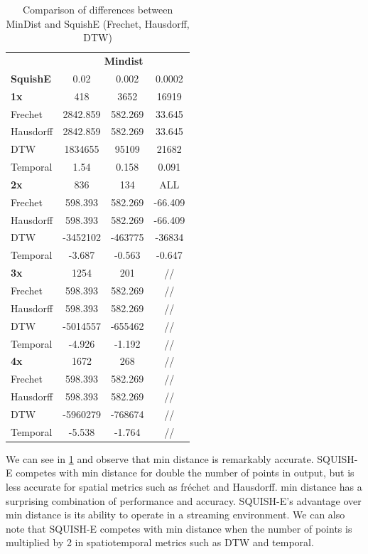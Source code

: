 \begin{table}[htbp]
	\centering
	\label{tab:mindist_vs_squish_comparison}
	\begin{tabular}{@{}lccc@{}}
		\toprule
		& \multicolumn{3}{c}{\textbf{Mindist}} \\
		\cmidrule(l){2-4}
		\textbf{SquishE} & 0.02 & 0.002 & 0.0002 \\
		\midrule
		\textbf{1x} 	& 418 	& 3652 & 16919 \\
		Frechet 		& 2842.859 & 582.269 & 33.645 \\
		Hausdorff 		& 2842.859 	& 582.269 & 33.645 \\
		DTW 			& 1834655 	& 95109 & 21682 \\
		Temporal 		& 1.54 	& 0.158 & 0.091 \\ \midrule
		\textbf{2x} 	& 836 & 134 & ALL \\
		Frechet 		& 598.393 & 582.269 & -66.409 \\
		Hausdorff 		& 598.393 & 582.269 & -66.409 \\
		DTW  		& -3452102 & -463775 & -36834 \\
		Temporal 	& -3.687 & -0.563 & -0.647 \\ \midrule
		\textbf{3x} 	& 1254 & 201 & // \\
		Frechet 		& 598.393 & 582.269 &  // \\
		Hausdorff 		& 598.393 & 582.269 &  // \\
		DTW 		& -5014557 & -655462 &  // \\
		Temporal 			& -4.926 & -1.192 & // \\ \midrule
		\textbf{4x} 	& 1672 & 268 &  // \\
		Frechet 		& 598.393 & 582.269 &  // \\
		Hausdorff 		& 598.393 & 582.269 &  // \\
		DTW 		& -5960279 & -768674 &  // \\
		Temporal 			& -5.538 & -1.764 &  // \\
		\bottomrule
	\end{tabular}
	\caption{Comparison of differences between MinDist and SquishE (Frechet, Hausdorff, DTW)}
\end{table}

We can see in \ref{tab:mindist_vs_squish_comparison} and observe that min distance is remarkably accurate. SQUISH-E competes with min distance for double the number of points in output, but is less accurate for spatial metrics such as fréchet and Hausdorff. min distance has a surprising combination of performance and accuracy. SQUISH-E's advantage over min distance is its ability to operate in a streaming environment. We can also note that SQUISH-E competes with min distance when the number of points is multiplied by 2 in spatiotemporal metrics such as DTW and temporal.


